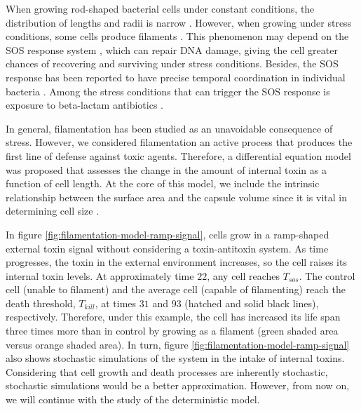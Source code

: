 \documentclass[a4paper, nobind]{templates/ociamthesis}
\begin{document}
When growing rod-shaped bacterial cells under constant conditions, the distribution of lengths and radii is narrow \autocite{schaechterGrowthCellNuclear1962}. However, when growing under stress conditions, some cells produce filaments \autocite{schaechterDependencyMediumTemperature1958}. This phenomenon may depend on the SOS response system \autocite{bosEmergenceAntibioticResistance2015}, which can repair DNA damage, giving the cell greater chances of recovering and surviving under stress conditions. Besides, the SOS response has been reported to have precise temporal coordination in individual bacteria \autocite{friedmanPreciseTemporalModulation2005}. Among the stress conditions that can trigger the SOS response is exposure to beta-lactam antibiotics \autocite{millerSOSResponseInduction2004}.

In general, filamentation has been studied as an unavoidable consequence of stress. However, we considered filamentation an active process that produces the first line of defense against toxic agents. Therefore, a differential equation model was proposed that assesses the change in the amount of internal toxin as a function of cell length. At the core of this model, we include the intrinsic relationship between the surface area and the capsule volume since it is vital in determining cell size \autocite{harrisRelativeRatesSurface2016}.

In figure \ref{fig:filamentation-model-ramp-signal}, cells grow in a ramp-shaped external toxin signal without considering a toxin-antitoxin system. As time progresses, the toxin in the external environment increases, so the cell raises its internal toxin levels. At approximately time \(22\), any cell reaches \(T_{sos}\). The control cell (unable to filament) and the average cell (capable of filamenting) reach the death threshold, \(T_{kill}\), at times \(31\) and \(93\) (hatched and solid black lines), respectively. Therefore, under this example, the cell has increased its life span three times more than in control by growing as a filament (green shaded area versus orange shaded area). In turn, figure \ref{fig:filamentation-model-ramp-signal} also shows stochastic simulations of the system in the intake of internal toxins. Considering that cell growth and death processes are inherently stochastic, stochastic simulations would be a better approximation. However, from now on, we will continue with the study of the deterministic model.
\end{document}
